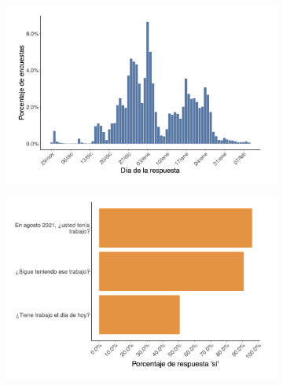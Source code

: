 \documentclass[oneside,11pt]{article}
\begin{document}
\begin{figure}[H]
    \caption{Worker Survey Graphs}
    \label{worker_surver_1}
    \begin{center}

    \begin{subfigure}{0.49\textwidth}
    \includegraphics[width=\textwidth]{04_Figures/workey_survey/Exp_1.png}
    \end{subfigure}
    \begin{subfigure}{0.49\textwidth}
    \includegraphics[width=\textwidth]{04_Figures/workey_survey/Exp_2.png}
    \end{subfigure}
    

\end{center}
\end{figure}
\end{document}
